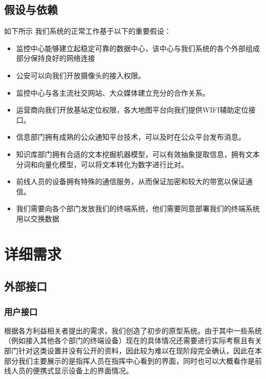 \documentclass{ctexrep}
\begin{document}
\section{假设与依赖}
如下所示 我们系统的正常工作基于以下的重要假设：
\begin{itemize}
\item 监控中心能够建立起稳定可靠的数据中心，该中心与我们系统的各个外部组成部分保持良好的网络连接
\item 公安可以向我们开放摄像头的接入权限。
\item 监控中心与各主流社交网站、大众媒体建立充分的合作关系。
\item 运营商向我们开放基站定位权限，各大地图平台向我们提供WIFI辅助定位接口。
\item 信息部门拥有成熟的公众通知平台技术，可以及时在公众平台发布消息。
\item 知识库部门拥有合适的文本挖掘机器模型，可以有效抽象提取信息，拥有文本分词和向量化模型，可以将文本转化为数字进行比对。
\item 前线人员的设备拥有特殊的通信服务，从而保证加密和较大的带宽以保证通信。
\item 我们需要向各个部门发放我们的终端系统，他们需要同意部署我们的终端系统用以交换数据
\end{itemize}

\chapter{详细需求}
\section{外部接口}
\subsection{用户接口}
根据各方利益相关者提出的需求，我们创造了初步的原型系统。由于其中一些系统（例如接入其他各个部门的终端设备）现在的具体情况还需要进行实际考察且有关部门针对这类设置并没有公开的资料，因此较为难以在现阶段完全确认，因此在本部分我们主要展示的是指挥人员在指挥中心看到的界面，同时也可以大概看作是前线人员的便携式显示设备上的界面情况。
\end{document}
